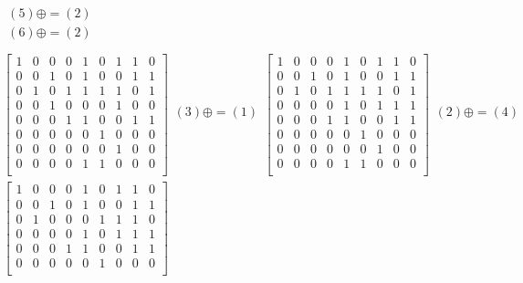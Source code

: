 \documentclass[a4paper,10pt]{article} %
\begin{document}
\begin{multline}
\begin{align}
		(5) \oplus= (2)\\
		(6) \oplus= (2)\\
		\end{align}\\
		\begin{bmatrix}
		1 & 0 & 0 & 0 & 1 & 0 & 1 & 1 & 0 \\
		0 & 0 & 1 & 0 & 1 & 0 & 0 & 1 & 1 \\
		0 & 1 & 0 & 1 & 1 & 1 & 1 & 0 & 1 \\
		0 & 0 & 1 & 0 & 0 & 0 & 1 & 0 & 0 \\
		0 & 0 & 0 & 1 & 1 & 0 & 0 & 1 & 1 \\
		0 & 0 & 0 & 0 & 0 & 1 & 0 & 0 & 0 \\
		0 & 0 & 0 & 0 & 0 & 0 & 1 & 0 & 0 \\
		0 & 0 & 0 & 0 & 1 & 1 & 0 & 0 & 0 \\
		\end{bmatrix}
		\begin{align}
		(3) \oplus= (1)\\
		\end{align}
		\begin{bmatrix}
		1 & 0 & 0 & 0 & 1 & 0 & 1 & 1 & 0 \\
		0 & 0 & 1 & 0 & 1 & 0 & 0 & 1 & 1 \\
		0 & 1 & 0 & 1 & 1 & 1 & 1 & 0 & 1 \\
		0 & 0 & 0 & 0 & 1 & 0 & 1 & 1 & 1 \\
		0 & 0 & 0 & 1 & 1 & 0 & 0 & 1 & 1 \\
		0 & 0 & 0 & 0 & 0 & 1 & 0 & 0 & 0 \\
		0 & 0 & 0 & 0 & 0 & 0 & 1 & 0 & 0 \\
		0 & 0 & 0 & 0 & 1 & 1 & 0 & 0 & 0 \\
		\end{bmatrix}
		\begin{align}
		(2) \oplus= (4)\\
		\end{align}\\
		\begin{bmatrix}
		1 & 0 & 0 & 0 & 1 & 0 & 1 & 1 & 0 \\
		0 & 0 & 1 & 0 & 1 & 0 & 0 & 1 & 1 \\
		0 & 1 & 0 & 0 & 0 & 1 & 1 & 1 & 0 \\
		0 & 0 & 0 & 0 & 1 & 0 & 1 & 1 & 1 \\
		0 & 0 & 0 & 1 & 1 & 0 & 0 & 1 & 1 \\
		0 & 0 & 0 & 0 & 0 & 1 & 0 & 0 & 0 \\

\end{bmatrix}
\end{multline}
\end{document}
